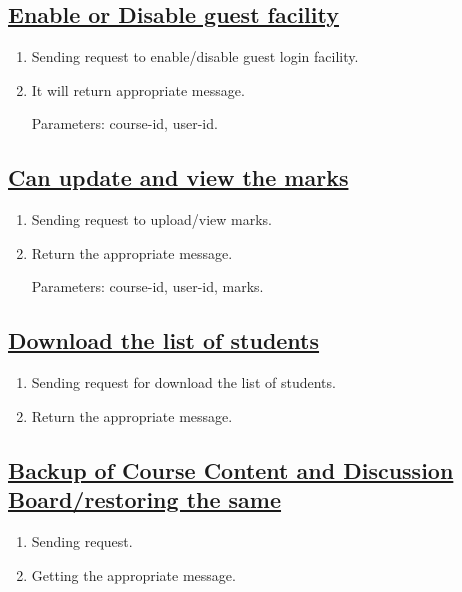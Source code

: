 \documentclass{article}
\begin{document}
\subsection*{\underline{Enable or Disable guest facility}}
\begin{enumerate}


	\item Sending request to enable/disable guest login facility.
	\item It will return appropriate message.

	              Parameters: course-id, user-id.

\begin{center}

\end{center}
\end{enumerate}
\subsection*{\underline{Can update and view the marks}}
\begin{enumerate}	
	\item Sending request to upload/view marks.
	\item Return the appropriate message.

              Parameters: course-id, user-id, marks.
\end{enumerate}
\subsection*{\underline{Download the list of students}}
\begin{enumerate}
	\item Sending request for download the list of students.
	\item Return the appropriate message.
\begin{center}

\end{center}
\end{enumerate}

\subsection*{\underline{Backup of Course Content and Discussion Board/restoring the same}}
\begin{enumerate}
\item Sending request.
	\item Getting the appropriate message.

\end{enumerate}
\end{document}
